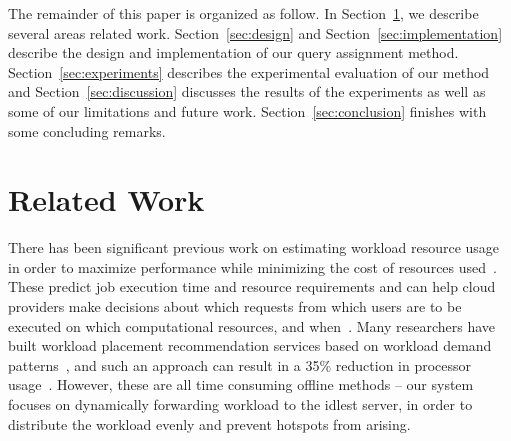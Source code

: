 The remainder of this paper is organized as follow. In Section~\ref{sec:relWork}, we describe several areas related work. Section~\ref{sec:design} and Section~\ref{sec:implementation} describe the design and implementation of our query assignment method. Section~\ref{sec:experiments} describes the experimental evaluation of our method and Section~\ref{sec:discussion} discusses the results of the experiments as well as some of our limitations and future work. Section~\ref{sec:conclusion} finishes with some concluding remarks.

\section{Related Work}
\label{sec:relWork}

There has been significant previous work on estimating workload resource usage in order to maximize performance while minimizing the cost of resources used~\cite{citeulike:6656217,5452742,curino2011relational, MIT-Relational}. These predict job execution time and resource requirements and can help cloud providers make decisions about which requests from which users are to be executed on which computational resources, and when~\cite{citeulike:6656217}. Many researchers have built workload placement recommendation services based on workload demand patterns~\cite{Gmach:2007:WAD:1524302.1524818, Atikoglu:2012:WAL:2254756.2254766}, and such an approach can result in a 35\% reduction in processor usage~\cite{Gmach:2007:WAD:1524302.1524818}. However, these are all time consuming offline methods -- our system focuses on dynamically forwarding workload to the idlest server, in order to distribute the workload evenly and prevent hotspots from arising.
 
